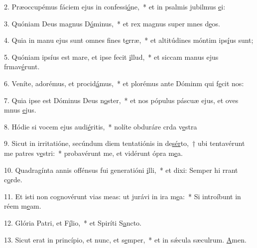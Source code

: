 2. Præoccupémus fáciem ejus in confessi\uline{ó}ne,~* et in psalmis jubilmus \uline{e}i:\par 
3. Quóniam Deus magnus D\uline{ó}minus,~* et rex magnus super mnes d\uline{e}os.\par 
4. Quia in manu ejus sunt omnes fines t\uline{e}rræ,~* et altitúdines móntim ips\uline{í}us sunt;\par 
5. Quóniam ipsíus est mare, et ipse fecit \uline{i}llud,~* et siccam manus ejus frmav\uline{é}runt.\par 
6. Veníte, adorémus, et procid\uline{á}mus,~* et plorémus ante Dóminm qui f\uline{e}cit nos:\par 
7. Quia ipse est Dóminus Deus n\uline{o}ster,~* et nos pópulus páscuæ ejus, et oves mnus \uline{e}jus.\par 
8. Hódie si vocem ejus audi\uline{é}ritis,~* nolíte obduráre crda v\uline{e}stra\par 
9. Sicut in irritatióne, secúndum diem tentatiónis in de\uline{sér}to,~† ubi tentavérunt me patres v\uline{e}stri:~* probavérunt me, et vidérunt ópra m\uline{e}a.\par 
10. Quadragínta annis offénsus fui generatióni \uline{i}lli,~* et dixi: Semper hi rrant c\uline{o}rde.\par 
11. Et isti non cognovérunt vias meas: ut jurávi in ira m\uline{e}a:~* Si introíbunt in réem m\uline{e}am.\par 
12. Glória Patri, et F\uline{í}lio,~* et Spiríti S\uline{a}ncto.\par 
13. Sicut erat in princípio, et nunc, et s\uline{e}mper,~* et in sǽcula sæculrum. \uline{A}men.\par 
